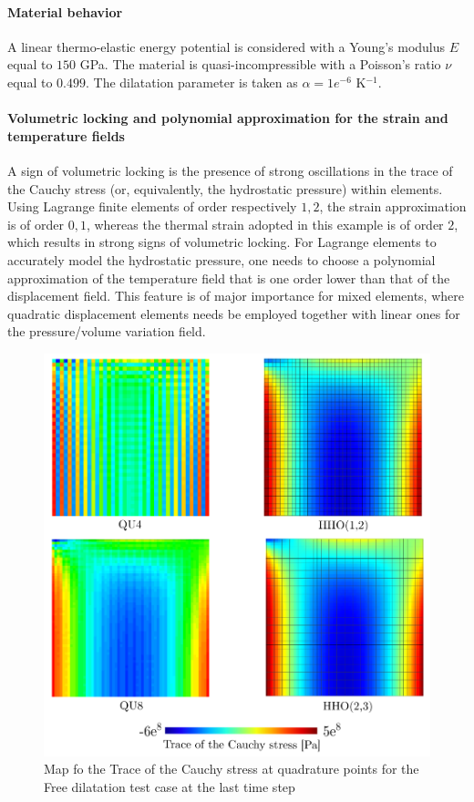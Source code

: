 \paragraph{Material behavior}

A linear thermo-elastic energy potential is considered with a Young's
modulus $E$ equal to $150$ GPa. The material is quasi-incompressible
with a Poisson's ratio $\nu$ equal to $0.499$. The dilatation parameter
is taken as $\alpha = 1e^{-6}$ K$^{-1}$.

\paragraph{Volumetric locking and polynomial approximation for the strain and temperature fields}

A sign of volumetric locking is the presence of strong oscillations in the trace of the Cauchy stress (or, equivalently, the hydrostatic pressure) within elements.
Using Lagrange finite elements of order respectively $1, 2$, the
strain approximation is of order $0, 1$, whereas the thermal
strain adopted in this example is of order $2$, which results in strong signs of volumetric locking. For Lagrange
elements to accurately model the hydrostatic pressure, one needs to choose a polynomial approximation of the temperature field that is one order lower than that of the
displacement field. This feature is of major importance for mixed
elements, where quadratic displacement elements needs be employed together with linear ones for the pressure/volume variation field.

\begin{figure}[H]
    \centering
    \includegraphics[width=10.cm]{../chapter_002_hho_mechanics/drawings/satoh_res.png}
    \caption{Map fo the Trace of the Cauchy stress at quadrature points for the Free dilatation test case at the last time step}
    \label{fig_satoh_calc}
\end{figure}

